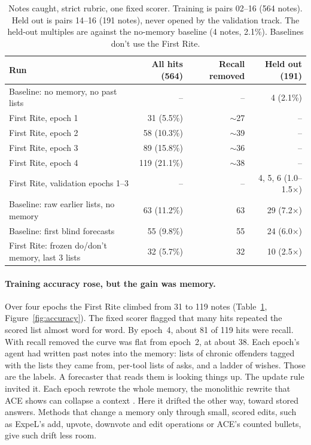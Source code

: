 \documentclass[10pt]{article}
\begin{document}
\begin{table}[t]
  \caption{Notes caught, strict rubric, one fixed scorer. Training is pairs 02--16 (564 notes). Held out is pairs 14--16 (191 notes), never opened by the validation track. The held-out multiples are against the no-memory baseline (4 notes, 2.1\%). Baselines don't use the First Rite.}
  \label{tab:main}
  \centering
  \small
  \begin{tabular}{@{}lrrr@{}}
    \toprule
    Run & All hits (564) & Recall removed & Held out (191) \\
    \midrule
    Baseline: no memory, no past lists & -- & -- & 4 (2.1\%) \\
    \midrule
    First Rite, epoch 1 & 31 (5.5\%) & $\sim$27 & -- \\
    First Rite, epoch 2 & 58 (10.3\%) & $\sim$39 & -- \\
    First Rite, epoch 3 & 89 (15.8\%) & $\sim$36 & -- \\
    First Rite, epoch 4 & 119 (21.1\%) & $\sim$38 & -- \\
    \midrule
    First Rite, validation epochs 1--3 & -- & -- & 4, 5, 6 (1.0--1.5$\times$) \\
    \midrule
    Baseline: raw earlier lists, no memory & 63 (11.2\%) & 63 & 29 (7.2$\times$) \\
    Baseline: first blind forecasts & 55 (9.8\%) & 55 & 24 (6.0$\times$) \\
    First Rite: frozen do/don't memory, last 3 lists & 32 (5.7\%) & 32 & 10 (2.5$\times$) \\
    \bottomrule
  \end{tabular}
\end{table}

\paragraph{Training accuracy rose, but the gain was memory.} Over four epochs the First Rite climbed from 31 to 119 notes (Table~\ref{tab:main}, Figure~\ref{fig:accuracy}). The fixed scorer flagged that many hits repeated the scored list almost word for word. By epoch~4, about 81 of 119 hits were recall. With recall removed the curve was flat from epoch~2, at about 38. Each epoch's agent had written past notes into the memory: lists of chronic offenders tagged with the lists they came from, per-tool lists of asks, and a ladder of wishes. Those are the labels. A forecaster that reads them is looking things up. The update rule invited it. Each epoch rewrote the whole memory, the monolithic rewrite that ACE shows can collapse a context \citep{zhang2026ace}. Here it drifted the other way, toward stored answers. Methods that change a memory only through small, scored edits, such as ExpeL's add, upvote, downvote and edit operations \citep{zhao2024expel} or ACE's counted bullets, give such drift less room.
\end{document}

